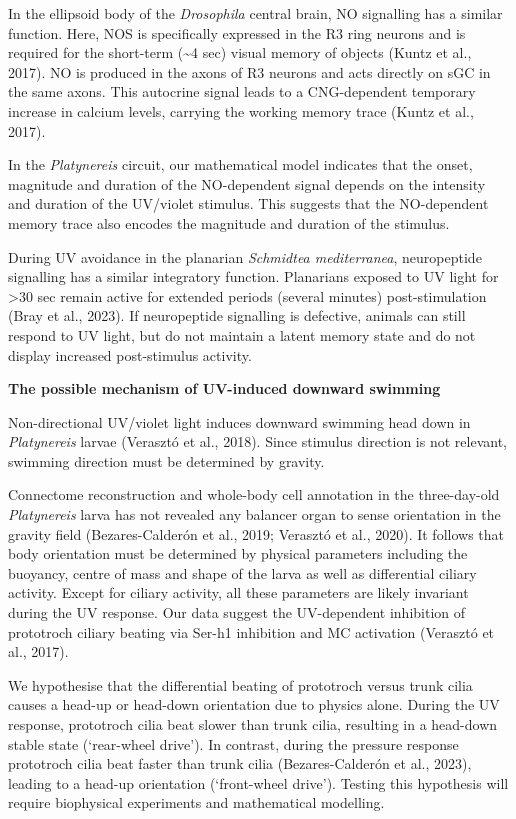 \documentclass[
  10pt,
  onecolumn]{article}
\begin{document}
In the ellipsoid body of the \emph{Drosophila} central brain, NO
signalling has a similar function. Here, NOS is specifically expressed
in the R3 ring neurons and is required for the short-term
(\textasciitilde4 sec) visual memory of objects (Kuntz et al., 2017). NO
is produced in the axons of R3 neurons and acts directly on sGC in the
same axons. This autocrine signal leads to a CNG-dependent temporary
increase in calcium levels, carrying the working memory trace (Kuntz et
al., 2017).

In the \emph{Platynereis} circuit, our mathematical model indicates that
the onset, magnitude and duration of the NO-dependent signal depends on
the intensity and duration of the UV/violet stimulus. This suggests that
the NO-dependent memory trace also encodes the magnitude and duration of
the stimulus.

During UV avoidance in the planarian \emph{Schmidtea mediterranea},
neuropeptide signalling has a similar integratory function. Planarians
exposed to UV light for \textgreater30 sec remain active for extended
periods (several minutes) post-stimulation (Bray et al., 2023). If
neuropeptide signalling is defective, animals can still respond to UV
light, but do not maintain a latent memory state and do not display
increased post-stimulus activity.

\textbf{The possible mechanism of UV-induced downward swimming}

Non-directional UV/violet light induces downward swimming head down in
\emph{Platynereis} larvae (Verasztó et al., 2018). Since stimulus
direction is not relevant, swimming direction must be determined by
gravity.

Connectome reconstruction and whole-body cell annotation in the
three-day-old \emph{Platynereis} larva has not revealed any balancer
organ to sense orientation in the gravity field (Bezares-Calderón et
al., 2019; Verasztó et al., 2020). It follows that body orientation must
be determined by physical parameters including the buoyancy, centre of
mass and shape of the larva as well as differential ciliary activity.
Except for ciliary activity, all these parameters are likely invariant
during the UV response. Our data suggest the UV-dependent inhibition of
prototroch ciliary beating via Ser-h1 inhibition and MC activation
(Verasztó et al., 2017).

We hypothesise that the differential beating of prototroch versus trunk
cilia causes a head-up or head-down orientation due to physics alone.
During the UV response, prototroch cilia beat slower than trunk cilia,
resulting in a head-down stable state (`rear-wheel drive'). In contrast,
during the pressure response prototroch cilia beat faster than trunk
cilia (Bezares-Calderón et al., 2023), leading to a head-up orientation
(`front-wheel drive'). Testing this hypothesis will require biophysical
experiments and mathematical modelling.
\end{document}
